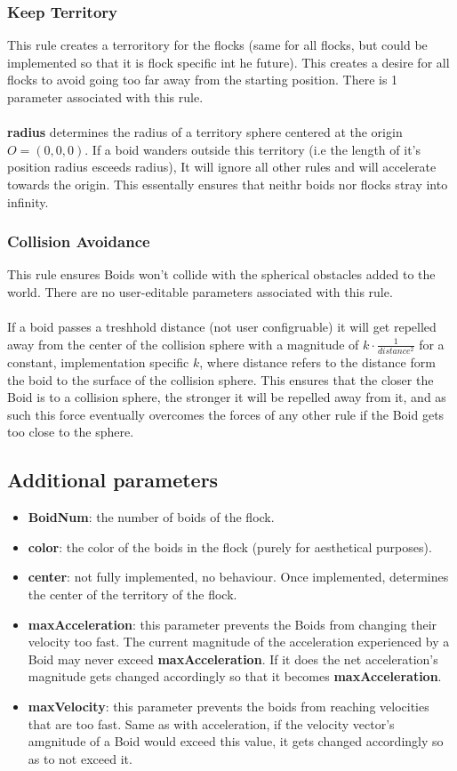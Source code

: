 \documentclass[12pt]{article}
\begin{document}
\subsubsection{Keep Territory}
This rule creates a terroritory for the flocks (same for all flocks, but could be implemented so that it is flock specific int he future). This creates a desire for all flocks to avoid going too far away from the starting position. There is 1 parameter associated with this rule.
\\ \\
\textbf{radius} determines the radius of a territory sphere centered at the origin $O=(0,0,0)$. If a boid wanders outside this territory (i.e the length of it's position radius esceeds radius), It will ignore all other rules and will accelerate towards the origin. This essentally ensures that neithr boids nor flocks stray into infinity.

\subsubsection{Collision Avoidance}
This rule ensures Boids won't collide with the spherical obstacles added to the world. There are no user-editable parameters associated with this  rule.
\\ \\
If a boid passes a treshhold distance (not user configruable) it will get repelled away from the center of the collision sphere with a magnitude of $k\cdot \frac{1}{distance^2}$ for a constant, implementation specific $k$, where distance refers to the distance form the boid to the surface of the collision sphere. This ensures that the closer the Boid is to a collision sphere, the stronger it will be repelled away from it, and as such this force eventually overcomes the forces of any other rule if the Boid gets too close to the sphere.

\subsection{Additional parameters}
\begin{itemize}
	\item \textbf{BoidNum}: the number of boids of the flock.
	\item \textbf{color}: the color of the boids in the flock (purely for aesthetical purposes).
	\item \textbf{center}: not fully implemented, no behaviour. Once implemented, determines the center of the territory of the flock.
	\item \textbf{maxAcceleration}: this parameter prevents the Boids from changing their velocity too fast. The current magnitude of the acceleration experienced by a Boid may never exceed \textbf{maxAcceleration}. If it does the net acceleration's magnitude gets changed accordingly so that it becomes \textbf{maxAcceleration}.
	\item \textbf{maxVelocity}: this parameter prevents the boids from reaching velocities that are too fast. Same as with acceleration, if the velocity vector's amgnitude of a Boid would exceed this value, it gets changed accordingly so as to not exceed it. 
\end{itemize}
\end{document}
